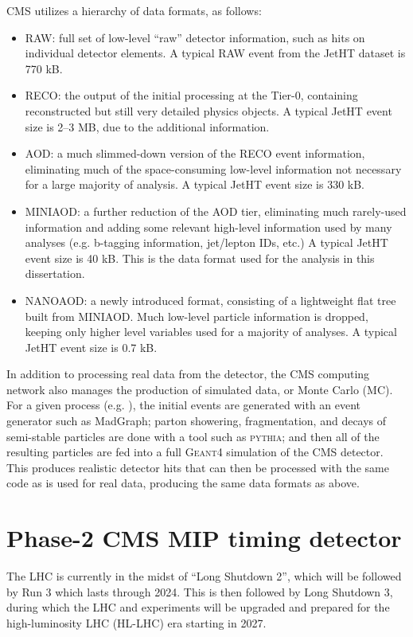 CMS utilizes a hierarchy of data formats, as follows:
\vspace{-2mm}
\begin{itemize}\setlength\itemsep{-1mm}
\item {RAW}: full set of low-level ``raw'' detector information, such as hits on individual detector elements.
A typical {RAW} event from the JetHT dataset is 770 kB.
\item {RECO}: the output of the initial processing at the Tier-0, containing reconstructed but still very detailed physics objects.
A typical JetHT event size is 2--3 MB, due to the additional information.
\item {AOD}: a much slimmed-down version of the {RECO} event information, eliminating much of
the space-consuming low-level information not necessary for a large majority of analysis. A typical JetHT event
size is 330 kB.
\item {MINIAOD}: a further reduction of the {AOD} tier, eliminating much rarely-used information
and adding some relevant high-level information used by many analyses (e.g. b-tagging information, jet/lepton IDs, etc.)
A typical JetHT event size is 40 kB. This is the data format used for the analysis in this dissertation.
\item NANOAOD: a newly introduced format, consisting of a lightweight flat tree built from MINIAOD. Much low-level
particle information is dropped, keeping only higher level variables used for a majority of analyses.
A typical JetHT event size is 0.7 kB.
\end{itemize}

In addition to processing real data from the detector, the CMS computing network also manages the production
of simulated data, or Monte Carlo (MC). For a given process (e.g. \zll), the initial events
are generated with an event generator such as MadGraph; parton showering, fragmentation, and decays
of semi-stable particles are done with a tool such as \textsc{pythia}; and then all of the resulting
particles are fed into a full \textsc{Geant4} simulation of the CMS detector. This produces
realistic detector hits that can then be processed with the same code as is used for real data,
producing the same data formats as above.

\section{Phase-2 CMS MIP timing detector}

The LHC is currently in the midst of ``Long Shutdown 2'', which will be followed by Run 3 which lasts
through 2024. This is then followed by Long Shutdown 3, during which the LHC and experiments will
be upgraded and prepared for the high-luminosity LHC (HL-LHC) era starting in 2027.

